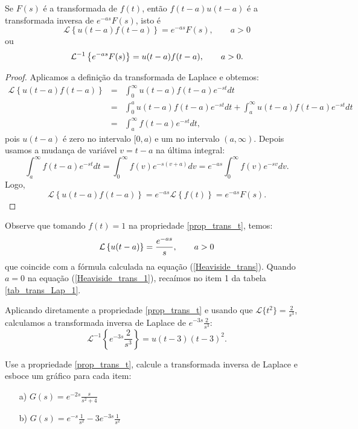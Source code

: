 \documentclass[Main.tex]{subfiles}
\begin{document}
\begin{propr}{\label{prop_trans_t}}Se $F(s)$ é a transformada de $f(t)$, então $f(t-a)u(t-a)$ é a transformada inversa de $e^{-as}F(s)$, isto é
\begin{equation}
\mathcal{L}\left\{u(t-a)f(t-a)\right\} =e^{-as}F(s),\qquad a>0
\end{equation}
ou
\begin{equation}{\label{eq_trans_t_inv}}
\mathcal{L}^{-1} \left\{e^{-as}F(s)\right\} =u(t-a)f(t-a),\qquad a>0.
\end{equation} 
\end{propr}
\begin{proof}Aplicamos a definição da transformada de Laplace e obtemos:
\begin{eqnarray*}
\mathcal{L}\left\{u(t-a)f(t-a)\right\}&=&\int_0^\infty u(t-a)f(t-a)e^{-st}dt\\
&=&\int_0^a u(t-a)f(t-a)e^{-st}dt+\int_a^\infty u(t-a)f(t-a)e^{-st}dt\\
&=&\int_a^\infty f(t-a)e^{-st}dt,
\end{eqnarray*}
pois $u(t-a)$ é zero no intervalo $[0,a)$ e um no intervalo $(a,\infty)$. Depois usamos a mudança de variável $v=t-a$ na última integral:
\begin{equation*}
\int_a^\infty f(t-a)e^{-st}dt=\int_0^\infty f(v)e^{-s(v+a)}dv=e^{-as}\int_0^\infty f(v)e^{-sv}dv.
\end{equation*}
Logo,
$$
\mathcal{L}\left\{u(t-a)f(t-a)\right\}=e^{-as}\mathcal{L}\left\{f(t)\right\}=e^{-as}F(s).
$$
\end{proof}
Observe que tomando $f(t)=1$ na propriedade \ref{prop_trans_t}, temos:
\begin{equation}{\label{Heaviside_trans_1}}
\mathcal{L}\left\{u(t-a)\right\} =\frac{e^{-as}}{s},\qquad a>0
\end{equation}
que coincide com a fórmula calculada na equação (\ref{Heaviside_trans}). Quando $a=0$ na equação (\ref{Heaviside_trans_1}), recaímos no item 1 da tabela \ref{tab_trans_Lap_1}.
\begin{ex} Aplicando diretamente a propriedade \ref{prop_trans_t} e usando que $\mathcal{L}\{t^2\}=\frac{2}{s^3}$, calculamos a transformada inversa de Laplace de $e^{-3s}\frac{2}{s^3}$:
$$
\mathcal{L}^{-1}\left\{e^{-3s}\frac{2}{s^3}\right\}=u(t-3)(t-3)^2.
$$
\end{ex}
\begin{prob}Use a propriedade \ref{prop_trans_t}, calcule a transformada inversa de Laplace e esboce um gráfico para cada item:
\begin{itemize}
\item[a)] $G(s)=e^{-2s}\frac{s}{s^2+4}$
\item[b)] $G(s)=e^{-s}\frac{1}{s^2}-3e^{-3s}\frac{1}{s^2}$
\end{itemize}
\end{prob}
\end{document}
